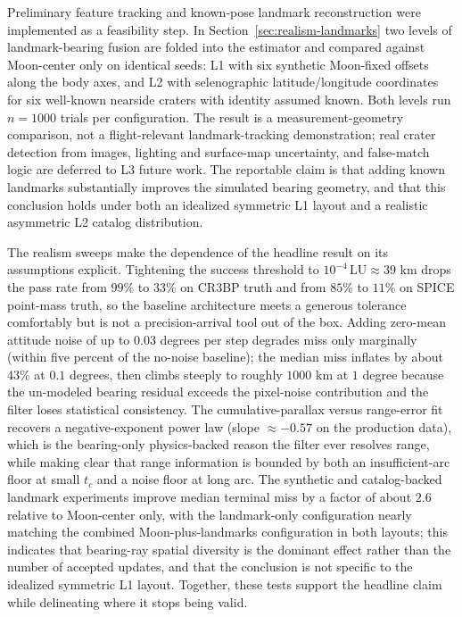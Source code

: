 \documentclass[10pt,twocolumn]{article}
\newcommand{\LU}{\mathrm{LU}}
\begin{document}
Preliminary feature tracking and known-pose landmark reconstruction were implemented as a feasibility step.  In Section~\ref{sec:realism-landmarks} two levels of landmark-bearing fusion are folded into the estimator and compared against Moon-center only on identical seeds: L1 with six synthetic Moon-fixed offsets along the body axes, and L2 with selenographic latitude/longitude coordinates for six well-known nearside craters with identity assumed known.  Both levels run $n=1000$ trials per configuration.  The result is a measurement-geometry comparison, not a flight-relevant landmark-tracking demonstration; real crater detection from images, lighting and surface-map uncertainty, and false-match logic are deferred to L3 future work.  The reportable claim is that adding known landmarks substantially improves the simulated bearing geometry, and that this conclusion holds under both an idealized symmetric L1 layout and a realistic asymmetric L2 catalog distribution.

The realism sweeps make the dependence of the headline result on its assumptions explicit.  Tightening the success threshold to $10^{-4}\,\LU\approx 39$ km drops the pass rate from $99\%$ to $33\%$ on CR3BP truth and from $85\%$ to $11\%$ on SPICE point-mass truth, so the baseline architecture meets a generous tolerance comfortably but is not a precision-arrival tool out of the box.  Adding zero-mean attitude noise of up to $0.03$ degrees per step degrades miss only marginally (within five percent of the no-noise baseline); the median miss inflates by about 43\% at $0.1$ degrees, then climbs steeply to roughly $1000$ km at $1$ degree because the un-modeled bearing residual exceeds the pixel-noise contribution and the filter loses statistical consistency.  The cumulative-parallax versus range-error fit recovers a negative-exponent power law (slope $\approx-0.57$ on the production data), which is the bearing-only physics-backed reason the filter ever resolves range, while making clear that range information is bounded by both an insufficient-arc floor at small $t_c$ and a noise floor at long arc.  The synthetic and catalog-backed landmark experiments improve median terminal miss by a factor of about $2.6$ relative to Moon-center only, with the landmark-only configuration nearly matching the combined Moon-plus-landmarks configuration in both layouts; this indicates that bearing-ray spatial diversity is the dominant effect rather than the number of accepted updates, and that the conclusion is not specific to the idealized symmetric L1 layout.  Together, these tests support the headline claim while delineating where it stops being valid.
\end{document}
